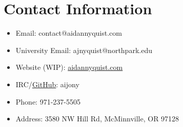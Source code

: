 \documentclass[aps,prl,reprint,groupedaddress,nofootinbib]{revtex4-1}
\begin{document}
\section{Contact Information}
\label{sec:org9144e37}
\begin{itemize}
\item Email: contact@aidannyquist.com
\item University Email: ajnyquist@northpark.edu
\item Website (WIP): \href{http://aidannyquist.com}{aidannyquist.com}
\item IRC/\href{https://github.com/}{GitHub}: aijony
\item Phone: 971-237-5505
\item Address: 3580 NW Hill Rd,
McMinnville, OR 97128
\end{itemize}
\end{document}
